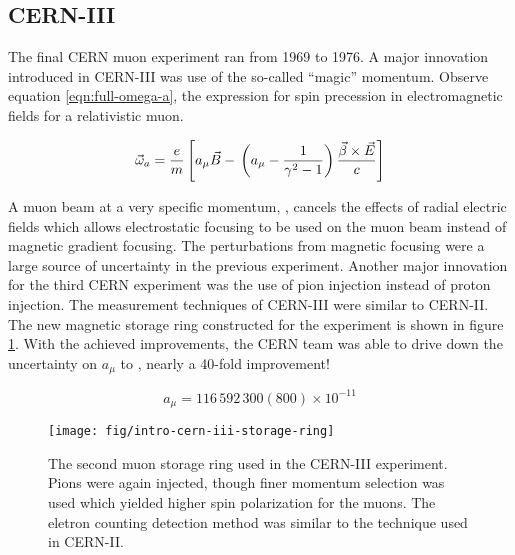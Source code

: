 \subsection{CERN-III}
The final CERN muon \gmtwo experiment ran from 1969 to 1976.  A major innovation introduced in CERN-III was use of the so-called ``magic'' momentum. Observe equation \ref{eqn:full-omega-a}, the expression for spin precession in electromagnetic fields for a relativistic muon.

\begin{equation}
\label{eqn:full-omega-a}
\vec{\omega}_a = \frac{e}{m} \left[ a_\mu \vec{B} - \\
\left(a_\mu - \frac{1}{\gamma^2 - 1} \right) \\
\frac{\vec{\beta} \times \vec{E}}{c} \right]
\end{equation}

\noindent A muon beam at a very specific momentum, \pmagic, cancels the effects of radial electric fields which allows electrostatic focusing to be used on the muon beam instead of magnetic gradient focusing.  The perturbations from magnetic focusing were a large source of uncertainty in the previous experiment.  Another major innovation for the third CERN experiment was the use of pion injection instead of proton injection.  The measurement techniques of CERN-III were similar to CERN-II.  The new magnetic storage ring constructed for the experiment is shown in figure \ref{fig:intro-cern-iii-storage-ring}.  With the achieved improvements, the CERN team was able to drive down the uncertainty on $a_\mu$ to  \cite{47y-muon-g-2}, nearly a 40-fold improvement!

\begin{equation}
\label{eqn:cern-iii-results}
a_\mu = 116\,592\,300 (800) \times 10^{-11}
\end{equation}

\begin{figure}
\centering
\texttt{[image: fig/intro-cern-iii-storage-ring]}
\caption{
    The second muon storage ring used in the CERN-III experiment.  Pions were again injected, though finer momentum selection was used which yielded higher spin polarization for the muons.  The eletron counting detection method was similar to the technique used in CERN-II.
    \label{fig:intro-cern-iii-storage-ring}    
}
\end{figure}

